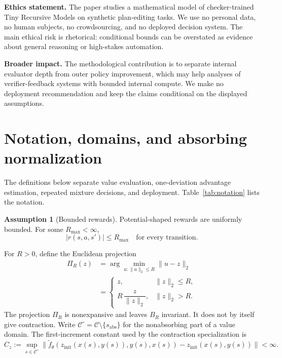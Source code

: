 \documentclass{article}
\theoremstyle{plain}
\theoremstyle{definition}
\newtheorem{assumption}[theorem]{Assumption}
\theoremstyle{remark}
\begin{document}
\textbf{Ethics statement.}
The paper studies a mathematical model of checker-trained Tiny Recursive Models on synthetic plan-editing tasks. We use no personal data, no human subjects, no crowdsourcing, and no deployed decision system. The main ethical risk is rhetorical: conditional bounds can be overstated as evidence about general reasoning or high-stakes automation.

\textbf{Broader impact.}
The methodological contribution is to separate internal evaluator depth from outer policy improvement, which may help analyses of verifier-feedback systems with bounded internal compute. We make no deployment recommendation and keep the claims conditional on the displayed assumptions.


{\sloppy


}


\clearpage
\appendix

\section{Notation, domains, and absorbing normalization}
\label{app:supplementary}

\label{app:notation}
The definitions below separate value evaluation, one-deviation advantage
estimation, repeated mixture decisions, and deployment. Table~\ref{tab:notation}
lists the notation.

\begin{assumption}[Bounded rewards]
\label{ass:bounded}
Potential-shaped rewards are uniformly bounded. For some $R_{\max}<\infty$,
\[
|r(s,a,s')|\le R_{\max}
\quad\text{for every transition}.
\]
\end{assumption}

For $R>0$, define the Euclidean projection
\begin{equation}
\begin{split}
\Pi_R(z) &= \arg\min_{u:\|u\|_2\le R}\|u-z\|_2 \\
&=
\begin{cases}
z, & \|z\|_2 \le R,\\[2pt]
R\,\dfrac{z}{\|z\|_2}, & \|z\|_2 > R.
\end{cases}
\end{split}
\label{eq:projection}
\end{equation}
The projection $\Pi_R$ is nonexpansive and leaves $B_R$ invariant.
It does not by itself give contraction.
Write $\mathcal C^\circ=\mathcal C\setminus\{s_{\mathrm{abs}}\}$ for the
nonabsorbing part of a value domain.
The first-increment constant used by the contraction specialization is
\begin{equation}
C_z := \sup_{s\in\mathcal C^\circ}
\bigl\|\widetilde f_\theta(z_{\mathrm{init}}(x(s),y(s)),y(s),x(s))
-z_{\mathrm{init}}(x(s),y(s))\bigr\|<\infty.
\label{eq:Cz_def}
\end{equation}
\end{document}
